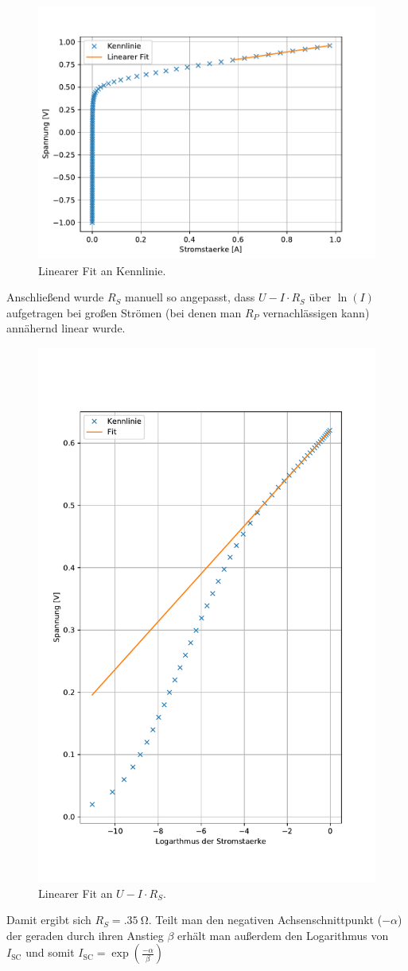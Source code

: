 \documentclass[slug=SZ, room=Hermann-Krone-Bau\,\ Labor\ 1.25, supervisor=Martin\ Kroll]{../../Lab_Report_LaTeX/lab_report}
\newcommand{\isc}{I_{\text{SC}}}
\begin{document}
\begin{figure}[H]\centering
  \includegraphics[width=.5\columnwidth]{./figs/python/A/dark_an_lin_fit.pdf}
  \caption{Linearer Fit an Kennlinie.}
  \label{fig:a-anorg-lin}
\end{figure}

Anschließend wurde \(R_S\) manuell so angepasst, dass \(U-I\cdot
R_S\) \"uber \(\ln(I)\) aufgetragen bei gro\ss{}en Str\"omen (bei
denen man \(R_P\) vernachl\"assigen kann) ann\"ahernd linear wurde.

\begin{figure}[H]\centering
  \includegraphics[width=.5\columnwidth]{./figs/python/A/dark_an_lin_fit_end.pdf}
  \caption{Linearer Fit an \(U-I\cdot R_S\).}
  \label{fig:a-anorg-lin-log}
\end{figure}

Damit ergibt sich \(R_S=\SI{.35}{\ohm}\). Teilt man den negativen
Achsenschnittpunkt (\(-\alpha\)) der geraden durch ihren Anstieg \(\beta\) erhält man
au\ss{}erdem den Logarithmus von \(\isc\) und somit \(\isc=\exp(\frac{-\alpha}{\beta})\)
\end{document}
